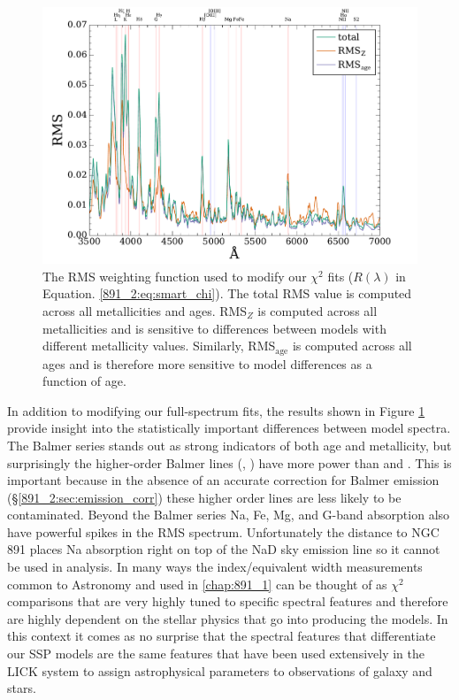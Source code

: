 \begin{figure}
  \centering
  \includegraphics[width=\columnwidth]{891_2/figs/RMS_spec.pdf}
  \caption[RMS-based $\chi^2$ fitting
    weights]{\fixspacing\label{891_2:fig:RMS_spec}The RMS weighting
    function used to modify our $\chi^2$ fits ($R(\lambda)$ in
    Equation. \ref{891_2:eq:smart_chi}). The total RMS value is
    computed across all metallicities and ages. RMS$_Z$ is computed
    across all metallicities and is sensitive to differences between
    models with different metallicity values. Similarly,
    RMS$_\mathrm{age}$ is computed across all ages and is therefore
    more sensitive to model differences as a function of age.}
\end{figure}

In addition to modifying our full-spectrum fits, the results shown in
Figure \ref{891_2:fig:RMS_spec} provide insight into the statistically
important differences between model spectra. The Balmer series stands
out as strong indicators of both age and metallicity, but surprisingly
the higher-order Balmer lines (\Hd, \Hg) have more power than \HB and
\Ha. This is important because in the absence of an accurate
correction for Balmer emission (\S\ref{891_2:sec:emission_corr}) these
higher order lines are less likely to be contaminated. Beyond the
Balmer series Na, Fe, Mg, and G-band absorption also have powerful
spikes in the RMS spectrum. Unfortunately the distance to NGC 891
places Na absorption right on top of the NaD sky emission line so it
cannot be used in analysis. In many ways the index/equivalent width
measurements common to Astronomy and used in \ref{chap:891_1}
can be thought of as $\chi^2$ comparisons that are very highly tuned
to specific spectral features and therefore are highly dependent on
the stellar physics that go into producing the models. In this context
it comes as no surprise that the spectral features that differentiate
our SSP models are the same features that have been used extensively
in the LICK system to assign astrophysical parameters to observations
of galaxy and stars.

